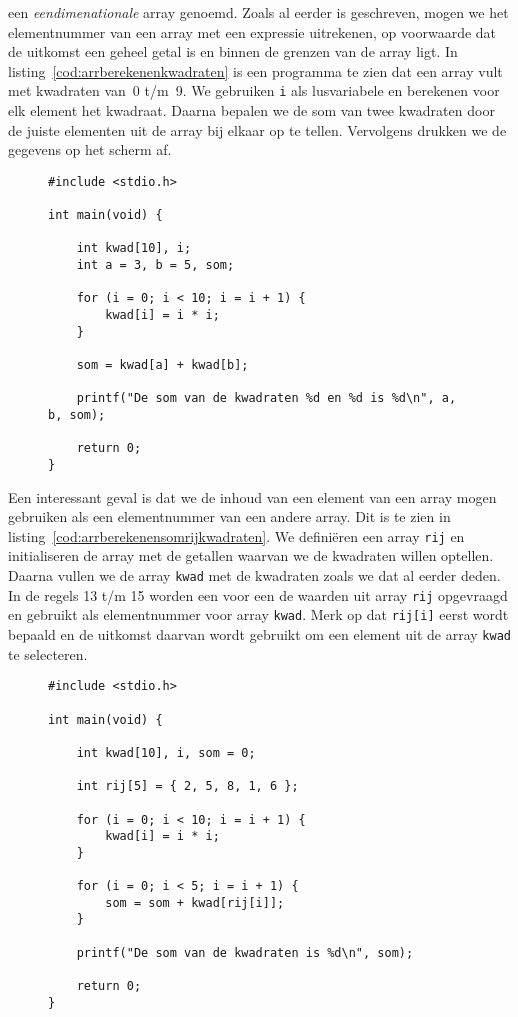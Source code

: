 een \textsl{eendimenationale} array genoemd.
Zoals al eerder is geschreven, mogen we het elementnummer van een array met een expressie uitrekenen, op voorwaarde dat de uitkomst een geheel getal is en binnen de grenzen van de array ligt. In listing~\ref{cod:arrberekenenkwadraten} is een programma te zien dat een array vult met kwadraten van~0 t/m~9. We gebruiken \texttt{i} als lusvariabele en berekenen voor elk element het kwadraat. Daarna bepalen we de som van twee kwadraten door de juiste elementen uit de array bij elkaar op te tellen. Vervolgens drukken we de gegevens op het scherm af.

\begin{figure}[!ht]
\begin{lstlisting}[caption=Afdrukken van de som van twee kwadraten.,label=cod:arrberekenenkwadraten]
#include <stdio.h>

int main(void) {

    int kwad[10], i;
    int a = 3, b = 5, som;

    for (i = 0; i < 10; i = i + 1) {
        kwad[i] = i * i;
    }

    som = kwad[a] + kwad[b];

    printf("De som van de kwadraten %d en %d is %d\n", a, b, som);

    return 0;
}
\end{lstlisting}
\end{figure}

Een interessant geval is dat we de inhoud van een element van een array mogen gebruiken als een elementnummer van een andere array. Dit is te zien in listing~\ref{cod:arrberekenensomrijkwadraten}. We definiëren een array \texttt{rij} en initialiseren de array met de getallen waarvan we de kwadraten willen optellen. Daarna vullen we de array \texttt{kwad} met de kwadraten zoals we dat al eerder deden. In de regels 13 t/m 15 worden een voor een de waarden uit array \texttt{rij} opgevraagd en gebruikt als elementnummer voor array \texttt{kwad}. Merk op dat \texttt{rij[i]} eerst wordt bepaald en de uitkomst daarvan wordt gebruikt om een element uit de array \texttt{kwad} te selecteren.

\begin{figure}[!ht]
\begin{lstlisting}[caption=Afdrukken van de som van twee  kwadraten.,label=cod:arrberekenensomrijkwadraten]
#include <stdio.h>

int main(void) {
 
    int kwad[10], i, som = 0;

    int rij[5] = { 2, 5, 8, 1, 6 };

    for (i = 0; i < 10; i = i + 1) {
        kwad[i] = i * i;
    }

    for (i = 0; i < 5; i = i + 1) {
        som = som + kwad[rij[i]];
    }

    printf("De som van de kwadraten is %d\n", som);

    return 0;
}
\end{lstlisting}
\end{figure}

